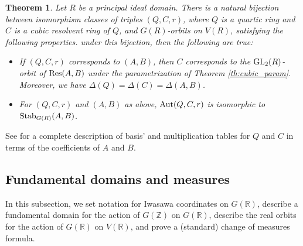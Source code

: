 \documentclass{article}
\def\Z{{\mathbb Z}}
\def\GL{{\rm GL}}
\def\Stab{{\rm Stab}}
\def\Aut{{\rm Aut}}
\def\Res{{\rm Res}}
\def\R{{\mathbb R}}
\def\Z{{\mathbb Z}}
\newtheorem{theorem}{Theorem}[section]
\begin{document}
\begin{theorem}\label{th:quartic_param}
Let $R$ be a principal ideal domain. There is a natural bijection between isomorphism classes of triples $(Q,C,r)$, where $Q$ is a quartic ring and $C$ is a cubic resolvent ring of $Q$, and $G(R)$-orbits on $V(R)$, satisfying the following properties.  under this bijection, then the following are true:
\begin{itemize}
\item[{\rm (a)}] If $(Q,C,r)$ corresponds to  $(A,B)$, then $C$ corresponds to the $\GL_2(R)$-orbit of $\Res(A,B)$ under the parametrization of Theorem \ref{th:cubic_param}. Moreover, we have $\Delta(Q)=\Delta(C)=\Delta(A,B)$.
\item[{\rm (b)}] For $(Q,C,r)$ and $(A,B)$ as above, $\Aut(Q,C,r)$ is isomorphic to $\Stab_{G(R)}(A,B)$.
\end{itemize}
\end{theorem}
See \cite[\S3.2, \S3.3]{BHCL3} for a complete description of basis' and multiplication tables for $Q$ and $C$ in terms of the coefficients of $A$ and $B$.


\subsection{Fundamental domains and measures}

In this subsection, we set notation for Iwasawa coordinates on $G(\R)$, describe a fundamental domain for the action of $G(\Z)$ on $G(\R)$, describe the real orbits for the action of $G(\R)$ on $V(\R)$, and prove a (standard) change of measures formula.
\end{document}
